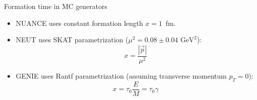 \begin{slide}[toc=FT in MC generators]{Formation time in MC generators}
\begin{itemize}
  \item NUANCE uses constant formation length $x = 1$~fm.
  
  \item NEUT uses SKAT parametrization ($\mu^2 = 0.08 \pm 0.04\mbox{ GeV}^2$): \vspace{-5pt}$$x = \frac{|\vec p|}{\mu^2}$$\vspace{-25pt}
 
  \item GENIE uses Rantf  parametrization (assuming transverse momentum $p_T = 0$): \vspace{-15pt}$$x = \tau_0 \frac{E}{M} = \tau_0 \gamma$$
  
 \end{itemize}
 
\end{slide}


